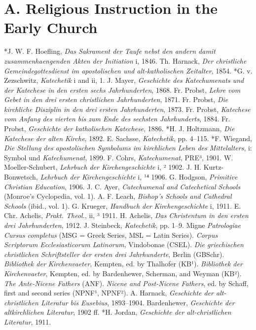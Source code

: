 \chapter{A. Religious Instruction in the Early Church}

*J. W. F. Hoefling, \emph{Das Sakrament der Taufe nebst den andern damit zusammenhaengenden Akten der Initiation} i, 1846. Th. Harnack, \emph{Der christliche Gemeindegottesdienst im apostolischen und alt-katholischen Zeitalter}, 1854. *G. v. Zezschwitz, \emph{Katechetik} i and ii, 1. J. Mayer, \emph{Geschichte des Katechumenats und der Katechese in den ersten sechs Jahrhunderten}, 1868. Fr. Probst, \emph{Lehre vom Gebet in den drei ersten christlichen Jahrhunderten}, 1871. Fr. Probst, \emph{Die kirchliche Disziplin in den drei ersten Jahrhunderten}, 1873. Fr. Probst, \emph{Katechese vom Anfang des vierten bis zum Ende des sechsten Jahrhunderts}, 1884. Fr. Probst, \emph{Geschichte der katholischen Katechese}, 1886. *H. J. Holtzmann, \emph{Die Katechese der alten Kirche}, 1892. E. Sachsse, \emph{Katechetik}, pp. 4–115. *F. Wiegand, \emph{Die Stellung des apostolischen Symbolums im kirchlichen Leben des Mittelalters}, i: Symbol und \emph{Katechumenat}, 1899. F. Cohrs, \emph{Katechumenat}, PRE³, 1901. W. Moeller-Schubert, \emph{Lehrbuch der Kirchengeschichte} i, ² 1902. J. H. Kurtz-Bonwetsch, \emph{Lehrbuch der Kirchengeschichte} i, ¹⁴ 1906. G. Hodgson, \emph{Primitive Christian Education}, 1906. J. C. Ayer, \emph{Catechumenal and Catechetical Schools} (Monroe’s Cyclopedia, vol. 1). A. F. Leach, \emph{Bishop’s Schools and Cathedral Schools} (ibid., vol. 1). G. Krueger, \emph{Handbuch der Kirchengeschichte} i, 1911. E. Chr. Achelis, \emph{Prakt. Theol.}, ii, ³ 1911. H. Achelis, \emph{Das Christentum in den ersten drei Jahrhunderten}, 1912. J. Steinbeck, \emph{Katechetik}, pp. 1–9. Migne \emph{Patrologiae Cursus completus} (MSG = Greek Series, MSL = Latin Series). \emph{Corpus Scriptorum Ecclesiasticorum Latinorum}, Vindobonae (CSEL). \emph{Die griechischen christlichen Schriftsteller der ersten drei Jahrhunderte}, Berlin (GBSchr). \emph{Bibliothek der Kirchenvaeter}, Kempten, ed. by Thalhofer (KB¹). \emph{Bibliothek der Kirchenvaeter}, Kempten, ed. by Bardenhewer, Scherman, and Weyman (KB²). \emph{The Ante-Nicene Fathers} (ANF). \emph{Nicene and Post-Nicene Fathers}, ed. by Schaff, first and second series (NPNF¹, NPNF²). A. Harnack, \emph{Geschichte der alt-christlichen Literatur bis Eusebius}, 1893–1904. Bardenhewer, \emph{Geschichte der altkirchlichen Literatur}, 1902 ff. *H. Jordan, \emph{Geschichte der alt-christlichen Literatur}, 1911.


